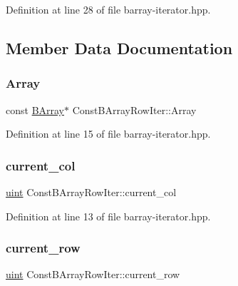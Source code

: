 Definition at line 28 of file barray-\/iterator.\+hpp.



\subsection{Member Data Documentation}
\mbox{\label{class_const_b_array_row_iter_a1c5a81b113e177015054e4950c688cfc}} 
\subsubsection{\texorpdfstring{Array}{Array}}
{\footnotesize\ttfamily const \hyperlink{class_b_array}{B\+Array}$\ast$ Const\+B\+Array\+Row\+Iter\+::\+Array}



Definition at line 15 of file barray-\/iterator.\+hpp.

\mbox{\label{class_const_b_array_row_iter_ae227ab3d9ed122274eefdf1de89686cc}} 
\subsubsection{\texorpdfstring{current\+\_\+col}{current\_col}}
{\footnotesize\ttfamily \hyperlink{typedefs_8hpp_a91ad9478d81a7aaf2593e8d9c3d06a14}{uint} Const\+B\+Array\+Row\+Iter\+::current\+\_\+col}



Definition at line 13 of file barray-\/iterator.\+hpp.

\mbox{\label{class_const_b_array_row_iter_a50fcd44dc8ad4788e5814227fbf625d6}} 
\subsubsection{\texorpdfstring{current\+\_\+row}{current\_row}}
{\footnotesize\ttfamily \hyperlink{typedefs_8hpp_a91ad9478d81a7aaf2593e8d9c3d06a14}{uint} Const\+B\+Array\+Row\+Iter\+::current\+\_\+row}



